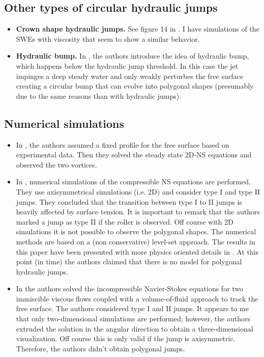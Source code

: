 \documentclass[english,11pt]{article}
\let\cite=\citet
\numberwithin{remark}{subsection}
\begin{document}
\subsection{Other types of circular hydraulic jumps}
\begin{itemize}
\item{\bf Crown shape hydraulic jumps.} See figure 14 in \cite{bush2006experimental}.
  I have simulations of the SWEs with viscosity that seem to show a similar behavior.

\item
  {\bf Hydraulic bump.} In \cite{labousse2013hydraulic}, the authors introduce the idea of hydraulic bump,
  which happens below the hydraulic jump threshold. In this case the jet impinges a deep steady water and only 
  weakly perturbes the free surface creating a circular bump that can evolve into polygonal shapes
  (presumably due to the same reasons than with hydraulic jumps).

\end{itemize}

\subsection{Numerical simulations}

\begin{itemize}
\item In \cite{bohr1996hydraulic}, the authors assumed a fixed profile for the free surface based on experimental data.
  Then they solved the steady state 2D-NS equations and observed the two vortices.

\item In \cite{yokoi2002mechanism}, numerical simulations of the compressible NS equations are performed.
  They use axisymmetrical simulations (i.e. 2D) and consider type I and type II jumps.
  They concluded that the transition between type I to II jumps is heavily affected by surface tension.
  It is important to remark that the authors marked a jump as type II if the roller is observed.
  Off course with 2D simulations it is not possible to observe the polygonal shapes. 
  The numerical methods are based on a (non conservative) level-set approach.
  The results in this paper have been presented with more physics oriented details in
  \cite{yokoi2000relationships,yokoi1999numerical}.
  At this point (in time) the authors claimed that there is no model for polygonal hydraulic jumps.

\item In \cite{passandideh2011numerical} the authors solved the incompressible Navier-Stokes equations for two immiscible
  viscous flows coupled with a volume-of-fluid approach to track the free surface.
  The authors considered type I and II jumps.
  It appears to me that only two-dimensional simulations are performed; however, the authors extruded
  the solution in the angular direction to obtain a three-dimensional visualization. Off course this is
  only valid if the jump is axisymmetric. Therefore, the authors didn't obtain polygonal jumps.
\end{itemize}
\end{document}
